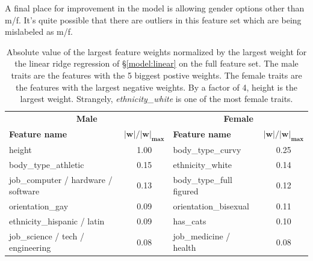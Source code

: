 \documentclass{article} %
\begin{document}
A final place for improvement in the model is allowing gender options other than m/f.  It's quite possible that there are outliers in this feature set which are being mislabeled as m/f.

\begin{table}[]
	\centering
	\caption{Absolute value of the largest feature weights normalized by the largest weight for the linear ridge regression of \S\ref{model:linear} on the full feature set.  The male traits are the features with the 5 biggest postive weights.  The female traits are the features with the largest negative weights.  By a factor of 4, height is the largest weight.  Strangely, \textit{ethnicity\_white} is one of the most female traits.}
	\label{table:best_predictors}
	\begin{tabular}{lc|lc}
		\multicolumn{2}{c}{\textbf{Male}}                        & \multicolumn{2}{c}{\textbf{Female}}           \\
		\textbf{Feature name}               & $\mathbf{|w|/|w|_{max}}$ & \textbf{Feature name}    & $\mathbf{|w|/|w|_{max}}$ \\ \hline
		height                              & 1.00               & body\_type\_curvy        & 0.25               \\
		body\_type\_athletic                & 0.15               & ethnicity\_white         & 0.14               \\
		job\_computer / hardware / software & 0.13               & body\_type\_full figured & 0.12               \\
		orientation\_gay                    & 0.09               & orientation\_bisexual    & 0.11               \\
		ethnicity\_hispanic / latin         & 0.09               & has\_cats                & 0.10               \\
		job\_science / tech / engineering   & 0.08               & job\_medicine / health   & 0.08              
	\end{tabular}
\end{table}

\end{document}
